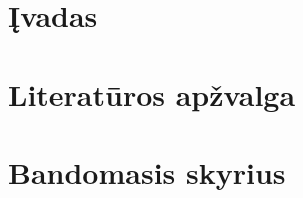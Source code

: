 \documentclass[12pt]{article}
\begin{document}
\newpage


\section{Įvadas}



    \blindtext                         %
    \par                               %
    \blindtext                         %

\newpage


\section{Literatūros apžvalga}


\newpage


\section{Bandomasis skyrius}

    \blindtext[10]                     %
\end{document}
